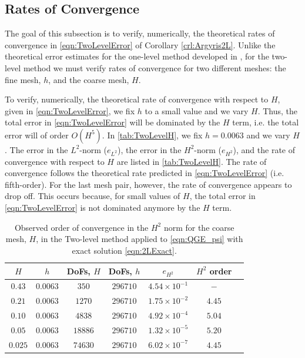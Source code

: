 \subsection{Rates of Convergence}\label{sse:Rates}
The goal of this subsection is to verify, numerically, the theoretical rates of
convergence in \eqref{eqn:TwoLevelError} of Corollary \ref{crl:Argyris2L}. Unlike
the theoretical error estimates for the one-level method developed in
\cite{Foster}, for the two-level method we must verify rates of convergence
for two different meshes: the fine mesh, $h$, and the coarse mesh, $H$.

To verify, numerically, the theoretical rate of convergence with respect to $H$,
given in \eqref{eqn:TwoLevelError}, we fix $h$ to a small value and we vary $H$.
Thus, the total error in \eqref{eqn:TwoLevelError} will be dominated by the $H$
term, i.e. the total error will of order $O(H^5)$. In \autoref{tab:TwoLevelH},
we fix $h=0.0063$ and we vary $H$. The error in the $L^2$-norm ($e_{L^2}$), the
error in the $H^2$-norm ($e_{H^2}$), and the rate of convergence with respect to
$H$ are listed in \autoref{tab:TwoLevelH}. The rate of convergence follows the
theoretical rate predicted in \eqref{eqn:TwoLevelError} (i.e. fifth-order). For the
last mesh pair, however, the rate of convergence appears to drop off. This
occurs because, for small values of $H$, the total error in
\eqref{eqn:TwoLevelError} is not dominated anymore by the $H$ term.
\begin{table}
  \begin{center}
    \begin{tabular}{|c|c|c|c|c|c|c|}
    \hline
      $H$ &   $h$ &   DoFs, $ H $ & DoFs, $ h $ & $e_{H^2}$ & $H^2$ order \\
      \hline
      $0.43$ & $0.0063$ & $350$ & $296710$ & $4.54\times 10^{-1}$ & $-$ \\[0.2em]
      $0.21$ & $0.0063$ & $1270$ & $296710$ & $1.75\times 10^{-2}$ & $4.45$ \\[0.2em]
      $0.10$ & $0.0063$ & $4838$ & $296710$ & $4.92\times 10^{-4}$ & $5.04$ \\[0.2em]
      $0.05$ & $0.0063$ & $18886$ & $296710$ & $1.32\times 10^{-5}$ & $5.20$ \\[0.2em]
      $0.025$ & $0.0063$ & $74630$ & $296710$ & $6.02\times 10^{-7}$ & $4.45$ \\[0.2em]
      \hline
    \end{tabular}
  \end{center}
  \caption{Observed order of convergence in the $H^2$ norm for the coarse mesh,
    $H$, in the Two-level method applied to \eqref{eqn:QGE_psi} with exact
    solution \eqref{eqn:2LExact}.}
  \label{tab:TwoLevelH}
\end{table}

